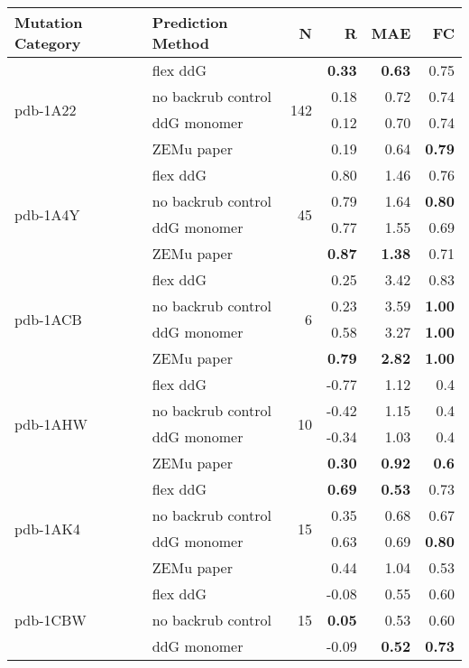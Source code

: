 \begin{table}
  \begin{tabular}{llrrrr}
\toprule
Mutation Category &   Prediction Method &   N &     R &  MAE &   FC \\
\midrule
 \multirow{ 4}{*}{pdb-1A22} & flex ddG & \multirow{ 4}{*}{142} & \textbf{0.33} & \textbf{0.63} & 0.75  \\
 & no backrub control & & 0.18 & 0.72 & 0.74  \\
 & ddG monomer & & 0.12 & 0.70 & 0.74  \\
 & ZEMu paper & & 0.19 & 0.64 & \textbf{0.79}  \\
\hline
 \multirow{ 4}{*}{pdb-1A4Y} & flex ddG & \multirow{ 4}{*}{45} & 0.80 & 1.46 & 0.76  \\
 & no backrub control & & 0.79 & 1.64 & \textbf{0.80}  \\
 & ddG monomer & & 0.77 & 1.55 & 0.69  \\
 & ZEMu paper & & \textbf{0.87} & \textbf{1.38} & 0.71  \\
\hline
 \multirow{ 4}{*}{pdb-1ACB} & flex ddG & \multirow{ 4}{*}{6} & 0.25 & 3.42 & 0.83  \\
 & no backrub control & & 0.23 & 3.59 & \textbf{1.00}  \\
 & ddG monomer & & 0.58 & 3.27 & \textbf{1.00}  \\
 & ZEMu paper & & \textbf{0.79} & \textbf{2.82} & \textbf{1.00}  \\
\hline
 \multirow{ 4}{*}{pdb-1AHW} & flex ddG & \multirow{ 4}{*}{10} & -0.77 & 1.12 & 0.4  \\
 & no backrub control & & -0.42 & 1.15 & 0.4  \\
 & ddG monomer & & -0.34 & 1.03 & 0.4  \\
 & ZEMu paper & & \textbf{0.30} & \textbf{0.92} & \textbf{0.6}  \\
\hline
 \multirow{ 4}{*}{pdb-1AK4} & flex ddG & \multirow{ 4}{*}{15} & \textbf{0.69} & \textbf{0.53} & 0.73  \\
 & no backrub control & & 0.35 & 0.68 & 0.67  \\
 & ddG monomer & & 0.63 & 0.69 & \textbf{0.80}  \\
 & ZEMu paper & & 0.44 & 1.04 & 0.53  \\
\hline
 \multirow{ 4}{*}{pdb-1CBW} & flex ddG & \multirow{ 4}{*}{15} & -0.08 & 0.55 & 0.60  \\
 & no backrub control & & \textbf{0.05} & 0.53 & 0.60  \\
 & ddG monomer & & -0.09 & \textbf{0.52} & \textbf{0.73}  \\

\end{tabular}
\end{table}
